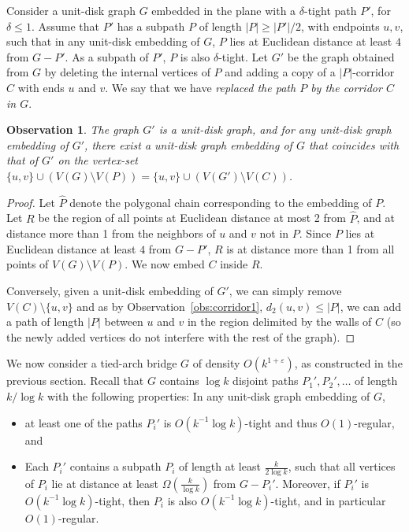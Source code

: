 \documentclass[a4paper,reqno, 12pt]{amsart}
\newtheorem{observation}[theorem]{Observation}
\begin{document}
\medskip

Consider a unit-disk graph $G$ embedded in the plane with a $\delta$-tight path
$P'$, for $\delta\le 1$. Assume that $P'$ has a subpath $P$ of
length $|P|\ge |P'|/2$, with
endpoints $u,v$,  such that in any
unit-disk embedding of $G$, $P$ lies at Euclidean distance at
least $4$ from $G-P'$.  As a subpath of $P'$, $P$ is also
$\delta$-tight. Let $G'$ be the graph obtained from $G$ by deleting the
internal vertices of $P$ and adding a copy of a $|P|$-corridor $C$  with
ends $u$ and $v$. We say that we have \emph{replaced the path $P$ by
  the corridor $C$ in $G$}.

\begin{observation}\label{corridorsubst}
The graph $G'$ is a unit-disk graph, and for any unit-disk graph
embedding of $G'$, there exist a unit-disk graph embedding of $G$ that
coincides with that of $G'$ on the vertex-set $\{u,v\}\cup (V(G)\setminus
V(P))=\{u,v\}\cup (V(G')\setminus V(C))$.
\end{observation}

\begin{proof}
  Let $\hat{P}$ denote the polygonal chain corresponding to the embedding
  of $P$. Let $R$ be the region of all points at Euclidean distance at
  most 2 from $\hat{P}$, and at distance more than 1 from the
  neighbors of $u$ and $v$ not in $P$. Since $P$ lies at Euclidean distance at
least $4$ from $G-P'$, $R$ is at distance more than 1 from all points
of $V(G)\setminus V(P)$. We now embed $C$ inside $R$.

 Conversely, given a unit-disk embedding of $G'$, we can simply remove
 $V(C)\setminus \{u,v\}$ and as by Observation~\ref{obs:corridor1},
 $d_2(u,v)\le |P|$, we can add a path of length $|P|$ between $u$ and
 $v$ in the region delimited by the walls of $C$ (so the newly added
 vertices do not interfere with the rest of the graph).
\end{proof}

We now consider a tied-arch bridge $G$
    of density $O(k^{1+\varepsilon})$, as
  constructed in the previous section. Recall that $G$ contains
  $\log k$ disjoint paths $P_1',P_2', \ldots$
of length $k/\log k$
with the following properties: In any unit-disk graph embedding of
$G$,
\begin{itemize}
\item at least one of the paths $P_i'$ is $O(k^{-1}\log k)$-tight and
  thus $O(1)$-regular, and
  \item Each $P_i'$ contains a subpath $P_i$ of
    length at least $\tfrac{k}{2\log k}$, such that all vertices of $P_i$ lie
    at distance at least $\Omega(\tfrac{k}{\log k})$ from $G-P_i'$. Moreover,
    if $P_i'$ is $O(k^{-1}\log k)$-tight, then  $P_i$ is also
    $O(k^{-1}\log k)$-tight, and in particular $O(1)$-regular.
  \end{itemize}
\end{document}
